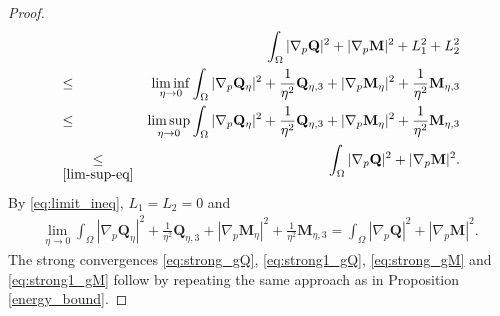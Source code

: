 \documentclass[10pt,a4paper]{amsart}
\def \Mvec{\mathbf{M}}
\def\Qvec{\mathbf{Q}}
\begin{document}
\begin{proof}
\begin{eqnarray}
& &\int_{\Omega}|\nabla_p\Qvec|^2+|\nabla_p\Mvec|^2+L^2_1+L_2^2\nonumber\\
&\le&\liminf_{\eta\rightarrow 0}\int_{\Omega}|\nabla_p\Qvec_{\eta}|^2+\frac{1}{\eta^2}\Qvec_{\eta,3}+|\nabla_p\Mvec_{\eta}|^2+\frac{1}{\eta^2}\Mvec_{\eta,3}\nonumber\\
&\le&\limsup_{\eta\rightarrow 0}\int_{\Omega}|\nabla_p\Qvec_{\eta}|^2+\frac{1}{\eta^2}\Qvec_{\eta,3}+|\nabla_p\Mvec_{\eta}|^2+\frac{1}{\eta^2}\Mvec_{\eta,3}\nonumber\\
&\underset{\eqref{lim-sup-eq}}{\le}&\int_{\Omega}|\nabla_p\Qvec|^2+|\nabla_p\Mvec|^2.\label{eq:limit_ineq}
\end{eqnarray}
By \eqref{eq:limit_ineq}, $L_1=L_2=0$ and
\begin{eqnarray}
\lim_{\eta\rightarrow 0}\int_{\Omega}|\nabla_p\Qvec_{\eta}|^2+\frac{1}{\eta^2}\Qvec_{\eta,3}+|\nabla_p\Mvec_{\eta}|^2+\frac{1}{\eta^2}\Mvec_{\eta,3}=\int_{\Omega}|\nabla_p\Qvec|^2+|\nabla_p\Mvec|^2.
\end{eqnarray} 
The strong convergences \eqref{eq:strong_gQ}, \eqref{eq:strong1_gQ}, \eqref{eq:strong_gM} and \eqref{eq:strong1_gM} follow by repeating the same approach as in Proposition \ref{energy_bound}.
\end{proof}
\end{document}
